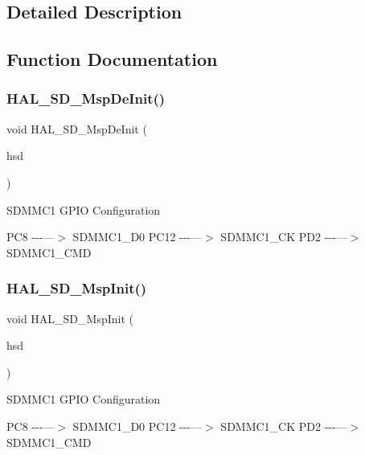 \subsection{Detailed Description}


\subsection{Function Documentation}
\mbox{\label{group___s_d___exported___functions___group1_gaad3ad0f8145fca4a29dbe8beef5db085}} 
\subsubsection{\texorpdfstring{HAL\_SD\_MspDeInit()}{HAL\_SD\_MspDeInit()}}
{\footnotesize\ttfamily void H\+A\+L\+\_\+\+S\+D\+\_\+\+Msp\+De\+Init (\begin{DoxyParamCaption}\item[{\mbox{\hyperlink{group___s_d___exported___types___group3_ga1f31eb64a86b0c740bb5c02fa4c9914d}{S\+D\+\_\+\+Handle\+Type\+Def}} $\ast$}]{hsd }\end{DoxyParamCaption})}

S\+D\+M\+M\+C1 G\+P\+IO Configuration

P\+C8 -\/-\/-\/---$>$ S\+D\+M\+M\+C1\+\_\+\+D0 P\+C12 -\/-\/-\/---$>$ S\+D\+M\+M\+C1\+\_\+\+CK P\+D2 -\/-\/-\/---$>$ S\+D\+M\+M\+C1\+\_\+\+C\+MD\mbox{\label{group___s_d___exported___functions___group1_ga11b692d44079cb65eb037202d627ae96}} 
\subsubsection{\texorpdfstring{HAL\_SD\_MspInit()}{HAL\_SD\_MspInit()}}
{\footnotesize\ttfamily void H\+A\+L\+\_\+\+S\+D\+\_\+\+Msp\+Init (\begin{DoxyParamCaption}\item[{\mbox{\hyperlink{group___s_d___exported___types___group3_ga1f31eb64a86b0c740bb5c02fa4c9914d}{S\+D\+\_\+\+Handle\+Type\+Def}} $\ast$}]{hsd }\end{DoxyParamCaption})}

S\+D\+M\+M\+C1 G\+P\+IO Configuration

P\+C8 -\/-\/-\/---$>$ S\+D\+M\+M\+C1\+\_\+\+D0 P\+C12 -\/-\/-\/---$>$ S\+D\+M\+M\+C1\+\_\+\+CK P\+D2 -\/-\/-\/---$>$ S\+D\+M\+M\+C1\+\_\+\+C\+MD
